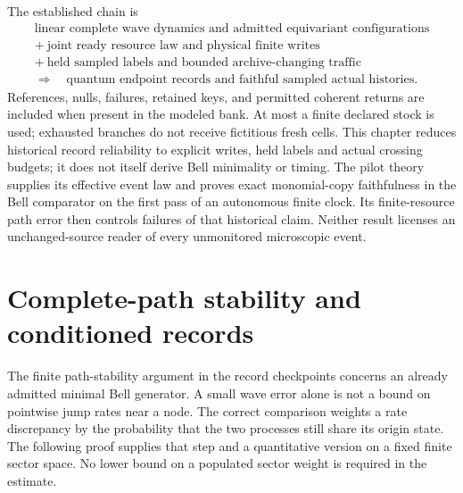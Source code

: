 \documentclass[11pt,oneside,openany]{book}
\theoremstyle{definition}
\theoremstyle{remark}\newtheorem{remark}[theorem]{Remark}
\begin{document}
The established chain is
\[
 \begin{gathered}
 \text{linear complete wave dynamics and admitted equivariant configurations}\\
 +\ \text{joint ready resource law and physical finite writes}\\
 +\ \text{held sampled labels and bounded archive-changing traffic}\\
 \Longrightarrow\quad
 \text{quantum endpoint records and faithful sampled actual histories}.
 \end{gathered}
\]
References, nulls, failures, retained keys, and permitted coherent returns
are included when present in the modeled bank. At most a finite declared
stock is used; exhausted branches do not receive fictitious fresh cells.
This chapter reduces historical record reliability to explicit writes,
held labels and actual crossing budgets; it does not itself derive Bell
minimality or timing. The pilot theory supplies its effective event
law and proves exact monomial-copy faithfulness in the Bell comparator on
the first pass of an autonomous finite clock. Its finite-resource path
error then controls failures of that historical claim. Neither result
licenses an unchanged-source reader of every unmonitored microscopic event.



\chapter{Complete-path stability and conditioned records}
\label{int:stability-chapter}

The finite path-stability argument in the record checkpoints \cite{C02,C03} concerns an already admitted minimal Bell generator. A small wave error alone is not a bound on pointwise jump rates near a node. The correct comparison weights a rate discrepancy by the probability that the two processes still share its origin state. The following proof supplies that step and a quantitative version on a fixed finite sector space. No lower bound on a populated sector weight is required in the estimate.
\end{document}
